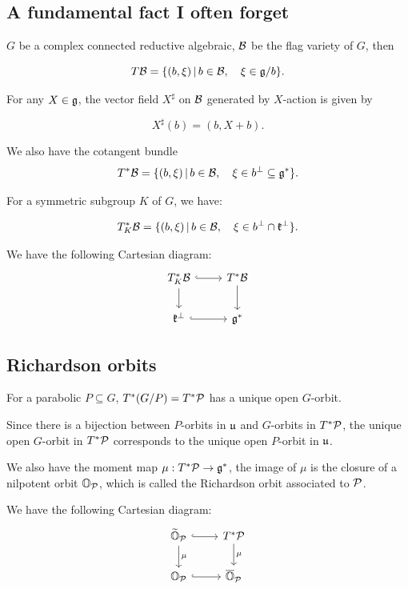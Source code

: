 
\subsection{A fundamental fact I often forget}

$G$ be a complex connected reductive algebraic, $\mathcal{B}$ be the flag variety of $G$, then

\[
  T\mathcal{B} = \{(b,\xi)\,|\,b \in \mathcal{B} , \quad \xi \in \mathfrak{g}/b\}.
\]

For any $X \in \mathfrak{g}$, the vector field $X^{\sharp}$ on $\mathcal{B}$ generated by $X$-action is given by

\[
  X^{\sharp}(b) = (b, X + b).
\]

We also have the cotangent bundle
\[
  T^*\mathcal{B} = \{(b, \xi)\,|\,b \in \mathcal{B}, \quad \xi \in b^{\perp} \subseteq \mathfrak{g}^*\}.
\]

For a symmetric subgroup $K$ of $G$, we have:

\[
  T^*_{K} \mathcal{B} = \{(b, \xi)\,|\,b \in \mathcal{B}, \quad \xi \in b^{\perp} \cap \mathfrak{k}^{\perp}\}.
\]

We have the following Cartesian diagram:
\[
  \begin{tikzcd}
    T^*_{K} \CB \arrow[r, hook] \arrow[d] & T^* \CB \arrow[d] \\
    \fk^{\perp} \arrow[r, hook] & \fg^*
  \end{tikzcd}
\]


\subsection{Richardson orbits}

For a parabolic $P \subseteq G$, $T^*(G/P) = T^*\mathcal{P}$ has a unique open $G$-orbit.

Since there is a bijection between $P$-orbits in $\mathfrak{u}$ and $G$-orbits in $T^*\mathcal{P}$, the unique open $G$-orbit in $T^*\mathcal{P}$ corresponds to the unique open $P$-orbit in $\mathfrak{u}$.

We also have the moment map $\mu: T^*\mathcal{P} \to \mathfrak{g}^*$, the image of $\mu$ is the closure of a nilpotent orbit $\mathbb{O}_{\mathcal{P}}$, which is called the Richardson orbit associated to $\mathcal{P}$.

We have the following Cartesian diagram:
\[
  \begin{tikzcd}
    \widetilde{\BO}_{\CP} \arrow[r, hook] \arrow[d, "\mu"] & T^*\CP \arrow[d, "\mu"] \\
    \BO_{\CP} \arrow[r, hook] & \overline{\BO}_{\CP}
  \end{tikzcd}
\]

